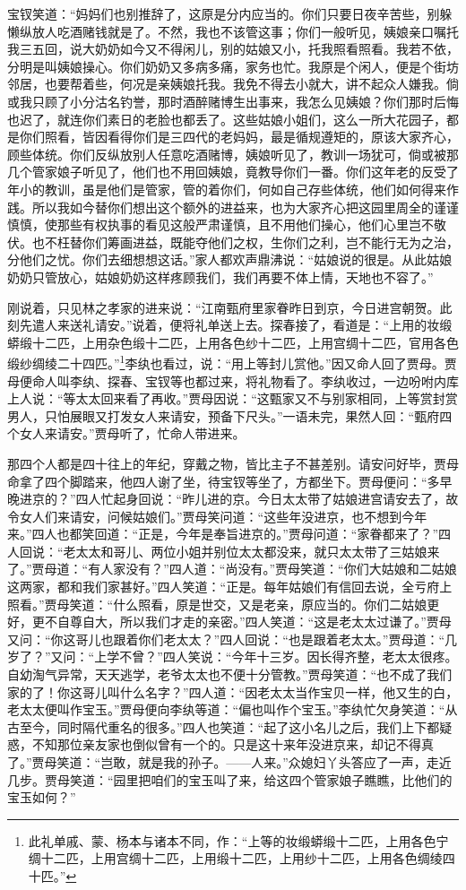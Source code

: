 宝钗笑道：“妈妈们也别推辞了，这原是分内应当的。你们只要日夜辛苦些，别躲懒纵放人吃酒赌钱就是了。不然，我也不该管这事；你们一般听见，姨娘亲口嘱托我三五回，说大奶奶如今又不得闲儿，别的姑娘又小，托我照看照看。我若不依，分明是叫姨娘操心。你们奶奶又多病多痛，家务也忙。我原是个闲人，便是个街坊邻居，也要帮着些，何况是亲姨娘托我。我免不得去小就大，讲不起众人嫌我。倘或我只顾了小分沽名钓誉，那时酒醉赌博生出事来，我怎么见姨娘？你们那时后悔也迟了，就连你们素日的老脸也都丢了。这些姑娘小姐们，这么一所大花园子，都是你们照看，皆因看得你们是三四代的老妈妈，最是循规遵矩的，原该大家齐心，顾些体统。你们反纵放别人任意吃酒赌博，姨娘听见了，教训一场犹可，倘或被那几个管家娘子听见了，他们也不用回姨娘，竟教导你们一番。你们这年老的反受了年小的教训，虽是他们是管家，管的着你们，何如自己存些体统，他们如何得来作践。所以我如今替你们想出这个额外的进益来，也为大家齐心把这园里周全的谨谨慎慎，使那些有权执事的看见这般严肃谨慎，且不用他们操心，他们心里岂不敬伏。也不枉替你们筹画进益，既能夺他们之权，生你们之利，岂不能行无为之治，分他们之忧。你们去细想想这话。”家人都欢声鼎沸说：“姑娘说的很是。从此姑娘奶奶只管放心，姑娘奶奶这样疼顾我们，我们再要不体上情，天地也不容了。”

刚说着，只见林之孝家的进来说：“江南甄府里家眷昨日到京，今日进宫朝贺。此刻先遣人来送礼请安。”说着，便将礼单送上去。探春接了，看道是：“上用的妆缎蟒缎十二匹，上用杂色缎十二匹，上用各色纱十二匹，上用宫绸十二匹，官用各色缎纱绸绫二十四匹。”\footnote{此礼单戚、蒙、杨本与诸本不同，作：“上等的妆缎蟒缎十二匹，上用各色宁绸十二匹，上用宫绸十二匹，上用缎十二匹，上用纱十二匹，上用各色绸绫四十匹。”}李纨也看过，说：“用上等封儿赏他。”因又命人回了贾母。贾母便命人叫李纨、探春、宝钗等也都过来，将礼物看了。李纨收过，一边吩咐内库上人说：“等太太回来看了再收。”贾母因说：“这甄家又不与别家相同，上等赏封赏男人，只怕展眼又打发女人来请安，预备下尺头。”一语未完，果然人回：“甄府四个女人来请安。”贾母听了，忙命人带进来。

那四个人都是四十往上的年纪，穿戴之物，皆比主子不甚差别。请安问好毕，贾母命拿了四个脚踏来，他四人谢了坐，待宝钗等坐了，方都坐下。贾母便问：“多早晚进京的？”四人忙起身回说：“昨儿进的京。今日太太带了姑娘进宫请安去了，故令女人们来请安，问候姑娘们。”贾母笑问道：“这些年没进京，也不想到今年来。”四人也都笑回道：“正是，今年是奉旨进京的。”贾母问道：“家眷都来了？”四人回说：“老太太和哥儿、两位小姐并别位太太都没来，就只太太带了三姑娘来了。”贾母道：“有人家没有？”四人道：“尚没有。”贾母笑道：“你们大姑娘和二姑娘这两家，都和我们家甚好。”四人笑道：“正是。每年姑娘们有信回去说，全亏府上照看。”贾母笑道：“什么照看，原是世交，又是老亲，原应当的。你们二姑娘更好，更不自尊自大，所以我们才走的亲密。”四人笑道：“这是老太太过谦了。”贾母又问：“你这哥儿也跟着你们老太太？”四人回说：“也是跟着老太太。”贾母道：“几岁了？”又问：“上学不曾？”四人笑说：“今年十三岁。因长得齐整，老太太很疼。自幼淘气异常，天天逃学，老爷太太也不便十分管教。”贾母笑道：“也不成了我们家的了！你这哥儿叫什么名字？”四人道：“因老太太当作宝贝一样，他又生的白，老太太便叫作宝玉。”贾母便向李纨等道：“偏也叫作个宝玉。”李纨忙欠身笑道：“从古至今，同时隔代重名的很多。”四人也笑道：“起了这小名儿之后，我们上下都疑惑，不知那位亲友家也倒似曾有一个的。只是这十来年没进京来，却记不得真了。”贾母笑道：“岂敢，就是我的孙子。------人来。”众媳妇丫头答应了一声，走近几步。贾母笑道：“园里把咱们的宝玉叫了来，给这四个管家娘子瞧瞧，比他们的宝玉如何？”

